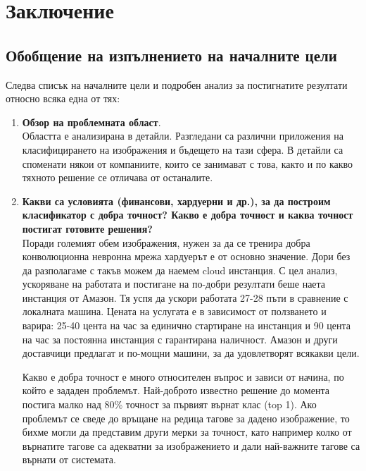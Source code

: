 \chapter{Заключение}

\label{Chapter5}


\section{Обобщение на изпълнението на началните цели}

Следва списък на началните цели и подробен анализ за постигнатите резултати относно всяка една от тях:
\begin{enumerate}
\item \textbf{Обзор на проблемната област}.\\
Областта е анализирана в детайли. Разгледани са различни приложения на класифицирането на изображения и бъдещето на тази сфера. В детайли са споменати някои от компаниите, които се занимават с това, както и по какво тяхното решение се отличава от останалите.

\item \textbf{Какви са условията (финансови, хардуерни и др.), за да построим класификатор с добра точност? Какво е добра точност и каква точност постигат готовите решения?}\\
Поради големият обем изображения, нужен за да се тренира добра конволюционна невронна мрежа хардуерът е от основно значение. Дори без да разполагаме с такъв можем да наемем cloud инстанция. С цел анализ, ускоряване на работата и постигане на по-добри резултати беше наета инстанция от Амазон. Тя успя да ускори работата 27-28 пъти в сравнение с локалната машина. Цената на услугата е в зависимост от ползването и варира: 25-40 цента на час за единично стартиране на инстанция и 90 цента на час за постоянна инстанция с гарантирана наличност. Амазон и други доставчици предлагат и по-мощни машини, за да удовлетворят всякакви цели.

Какво е добра точност е много относителен въпрос и зависи от начина, по който е зададен проблемът. Най-доброто известно решение до момента постига малко над 80\% точност за първият върнат клас (top 1). Ако проблемът се сведе до връщане на редица тагове за дадено изображение, то бихме могли да представим други мерки за точност, като например колко от върнатите тагове са адекватни за изображението и дали най-важните тагове са върнати от системата.


\end{enumerate}

